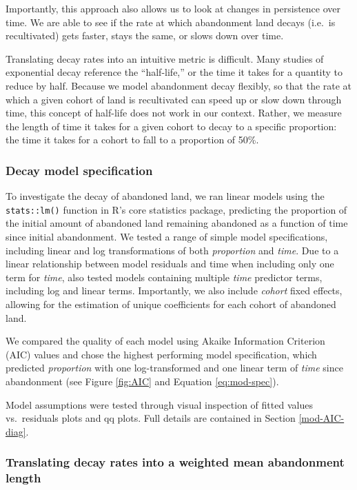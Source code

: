 \documentclass[
]{article}
\begin{document}
Importantly, this approach also allows us to look at changes in persistence over time.
We are able to see if the rate at which abandonment land decays (i.e.~is recultivated) gets faster, stays the same, or slows down over time.

Translating decay rates into an intuitive metric is difficult. Many studies of exponential decay reference the ``half-life,'' or the time it takes for a quantity to reduce by half. Because we model abandonment decay flexibly, so that the rate at which a given cohort of land is recultivated can speed up or slow down through time, this concept of half-life does not work in our context. Rather, we measure the length of time it takes for a given cohort to decay to a specific proportion: the time it takes for a cohort to fall to a proportion of 50\%.

\hypertarget{decay-model-specification}{%
\subsubsection{Decay model specification}\label{decay-model-specification}}

To investigate the decay of abandoned land, we ran linear models using the \texttt{stats::lm()} function in R's core statistics package, predicting the proportion of the initial amount of abandoned land remaining abandoned as a function of time since initial abandonment.
We tested a range of simple model specifications, including linear and log transformations of both \emph{proportion} and \emph{time}.
Due to a linear relationship between model residuals and time when including only one term for \emph{time}, also tested models containing multiple \emph{time} predictor terms, including log and linear terms.
Importantly, we also include \emph{cohort} fixed effects, allowing for the estimation of unique coefficients for each cohort of abandoned land.

We compared the quality of each model using Akaike Information Criterion (AIC) values and chose the highest performing model specification, which predicted \emph{proportion} with one log-transformed and one linear term of \emph{time} since abandonment (see Figure \ref{fig:AIC} and Equation \eqref{eq:mod-spec}).

Model assumptions were tested through visual inspection of fitted values vs.~residuals plots and qq plots.
Full details are contained in Section \ref{mod-AIC-diag}.

\hypertarget{translating-decay-rates-into-a-weighted-mean-abandonment-length}{%
\subsubsection{Translating decay rates into a weighted mean abandonment length}\label{translating-decay-rates-into-a-weighted-mean-abandonment-length}}
\end{document}
